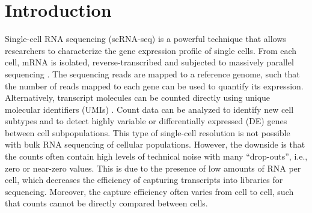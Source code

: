 \documentclass{bmcart}
\begin{document}



\section*{Introduction}
Single-cell RNA sequencing (scRNA-seq) is a powerful technique that allows researchers to characterize the gene expression profile of single cells.
From each cell, mRNA is isolated, reverse-transcribed and subjected to massively parallel sequencing \cite{stegle2015computational}.
The sequencing reads are mapped to a reference genome, such that the number of reads mapped to each gene can be used to quantify its expression.
Alternatively, transcript molecules can be counted directly using unique molecular identifiers (UMIs) \cite{islam2014quantitative}.
Count data can be analyzed to identify new cell subtypes and to detect highly variable or differentially expressed (DE) genes between cell subpopulations.
This type of single-cell resolution is not possible with bulk RNA sequencing of cellular populations.
However, the downside is that the counts often contain high levels of technical noise with many ``drop-outs'', i.e., zero or near-zero values.
This is due to the presence of low amounts of RNA per cell, which decreases the efficiency of capturing transcripts into libraries for sequencing.
Moreover, the capture efficiency often varies from cell to cell, such that counts cannot be directly compared between cells.
\end{document}
